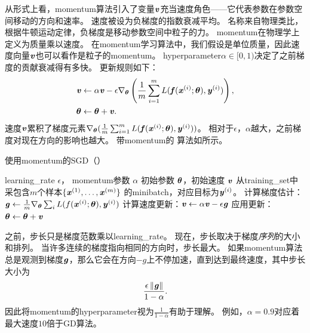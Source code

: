 从形式上看，\gls{momentum}算法引入了变量$\boldsymbol{\mathit{v}}$充当速度角色——它代表参数在参数空间移动的方向和速率。
速度被设为负梯度的指数衰减平均。
名称来自物理类比，根据牛顿运动定律，负梯度是移动参数空间中粒子的力。
\gls{momentum}在物理学上定义为质量乘以速度。
在\gls{momentum}学习算法中，我们假设是单位质量，因此速度向量$\boldsymbol{\mathit{v}}$也可以看作是粒子的\gls{momentum}。
\gls{hyperparameter}$\alpha\in[0,1)$决定了之前梯度的贡献衰减得有多快。
更新规则如下：
\begin{align}
\boldsymbol{\mathit{v}} & \leftarrow \alpha \boldsymbol{\mathit{v}} - \epsilon \nabla_{\boldsymbol{\theta}} \left( \frac{1}{m} \sum_{i=1}^m  L(\boldsymbol{\mathit{f}}(\boldsymbol{\mathit{x}}^{(i)}; \boldsymbol{\theta}), \boldsymbol{\mathit{y}}^{(i)}   )  \right), \\
\boldsymbol{\theta} & \leftarrow \boldsymbol{\theta}  + \boldsymbol{\mathit{v}} .
\end{align}
速度$\boldsymbol{\mathit{v}}$累积了梯度元素$\nabla_{\boldsymbol{\theta}}( \frac{1}{m} \sum_{i=1}^m L( \boldsymbol{\mathit{f}}(\boldsymbol{\mathit{x}}^{(i)}; \boldsymbol{\theta}), \boldsymbol{\mathit{y}}^{(i)} )  )$。
相对于$\epsilon$，$\alpha$越大，之前梯度对现在方向的影响也越大。
带\gls{momentum}的\,\,算法如所示。



\begin{algorithm}[ht]
\caption{使用\gls{momentum}的\gls{SGD}（）}
\label{alg:momentum}
\begin{algorithmic}
\REQUIRE \gls{learning_rate} $\epsilon$， \gls{momentum}参数 $\alpha$
\REQUIRE 初始参数 $\boldsymbol{\theta}$，初始速度 $\boldsymbol{\mathit{v}}$
    \STATE 从\gls{training_set}中采包含$m$个样本$\{ \boldsymbol{\mathit{x}}^{(1)},\dots, \boldsymbol{\mathit{x}}^{(m)}\}$ 的\gls{minibatch}，对应目标为$\boldsymbol{\mathit{y}}^{(i)}$。
    \STATE 计算梯度估计：$\boldsymbol{\mathit{g}} \leftarrow 
         \frac{1}{m} \nabla_{\boldsymbol{\theta}} \sum_i L(f(\boldsymbol{\mathit{x}}^{(i)};\boldsymbol{\theta}),\boldsymbol{\mathit{y}}^{(i)})$
    \STATE  计算速度更新：$\boldsymbol{\mathit{v}} \leftarrow \alpha \boldsymbol{\mathit{v}} - 
    \epsilon \boldsymbol{\mathit{g}}$
    \STATE 应用更新：$\boldsymbol{\theta} \leftarrow \boldsymbol{\theta} + \boldsymbol{\mathit{v}}$ 
\ENDWHILE
\end{algorithmic}
\end{algorithm}



之前，步长只是梯度范数乘以\gls{learning_rate}。
现在，步长取决于梯度\emph{序列}的大小和排列。
当许多连续的梯度指向相同的方向时，步长最大。
如果\gls{momentum}算法总是观测到梯度$\boldsymbol{\mathit{g}}$，那么它会在方向$-g$上不停加速，直到达到最终速度，其中步长大小为
\begin{equation}
    \frac{\epsilon \left\lVert\boldsymbol{\mathit{g}}\right\rVert}{1-\alpha} .
\end{equation}
因此将\gls{momentum}的\gls{hyperparameter}视为$\frac{1}{1-\alpha}$有助于理解。
例如，$\alpha=0.9$对应着最大速度$10$倍于\gls{GD}算法。

